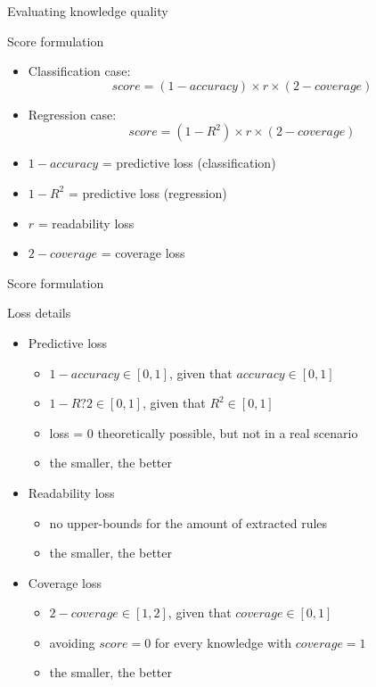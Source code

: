 \documentclass{beamer}
\newcommand{\lookat}{\item[\ding{43}]}
\begin{document}
\begin{frame}[c]{Evaluating knowledge quality}
	\begin{block}{Score formulation}
		\medskip
		\begin{itemize}
			\item Classification case:
			\begin{equation*}
				score = \left(1-accuracy\right) \times r \times \left(2-coverage\right)
			\end{equation*}
			\item Regression case:
			\begin{equation*}
				score = \left(1-R^2\right) \times r \times \left(2-coverage\right)
			\end{equation*}
			\lookat $1-accuracy$ = predictive loss (classification)
			\lookat $1-R^2$ = predictive loss (regression)
			\lookat $r$ = readability loss
			\lookat $2-coverage$ = coverage loss
		\end{itemize}
		\medskip
	\end{block}
\end{frame}

\begin{frame}[c]{Score formulation}
	\begin{block}{Loss details}
		\medskip
		\begin{itemize}
			\item Predictive loss
			\begin{itemize}
				\item $1-accuracy \in [0, 1]$, given that $accuracy \in [0, 1]$
				\item $1-R?2 \in [0, 1]$, given that $R^2 \in [0, 1]$
				\item loss = 0 theoretically possible, but not in a real scenario
				\item the smaller, the better
			\end{itemize}
			\smallskip
			\item Readability loss
			\begin{itemize}
				\item no upper-bounds for the amount of extracted rules
				\item the smaller, the better
			\end{itemize}
			\smallskip		
			\item Coverage loss
			\begin{itemize}
				\item $2-coverage \in [1, 2]$, given that $coverage \in [0, 1]$
				\item avoiding $score=0$ for every knowledge with $coverage=1$
				\item the smaller, the better
			\end{itemize}
		\end{itemize}
		\medskip
	\end{block}
\end{frame}
\end{document}
